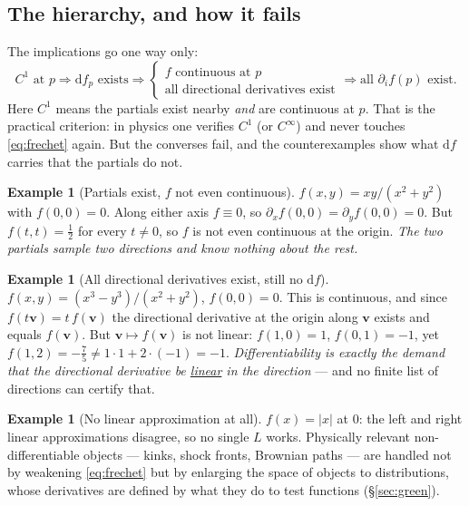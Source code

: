 \documentclass[10pt,a4paper]{article}
\newcommand{\dd}{\mathrm{d}}
\newcommand{\vv}{\mathbf{v}}
\theoremstyle{plain}
\theoremstyle{definition}
\newtheorem{ex}[thm]{Example}
\numberwithin{equation}{section}
\begin{document}
\subsection{The hierarchy, and how it fails}

The implications go one way only:
\begin{equation}
C^1\text{ at }p \Longrightarrow \dd f_p \text{ exists} \Longrightarrow
\begin{cases} f \text{ continuous at } p\\[1pt] \text{all directional derivatives exist}\end{cases}
\Longrightarrow \text{all } \partial_i f(p) \text{ exist.}
\label{eq:hierarchy}
\end{equation}
Here $C^1$ means the partials exist nearby \emph{and} are continuous at $p$. That is the
practical criterion: in physics one verifies $C^1$ (or $C^\infty$) and never touches
\eqref{eq:frechet} again. But the converses fail, and the counterexamples show what $\dd f$
carries that the partials do not.

\begin{ex}[Partials exist, $f$ not even continuous]\label{ex:xy}
$f(x,y)=xy/(x^2+y^2)$ with $f(0,0)=0$. Along either axis $f\equiv0$, so
$\partial_xf(0,0)=\partial_yf(0,0)=0$. But $f(t,t)=\tfrac12$ for every $t\ne0$, so $f$ is not
even continuous at the origin. \emph{The two partials sample two directions and know nothing
about the rest.}
\end{ex}

\begin{ex}[All directional derivatives exist, still no $\dd f$]\label{ex:allderiv}
$f(x,y)=(x^3-y^3)/(x^2+y^2)$, $f(0,0)=0$. This is continuous, and since $f(t\vv)=t\,f(\vv)$ the
directional derivative at the origin along $\vv$ exists and equals $f(\vv)$. But
$\vv\mapsto f(\vv)$ is not linear: $f(1,0)=1$, $f(0,1)=-1$, yet
$f(1,2)=-\tfrac75 \ne 1\cdot1+2\cdot(-1)=-1$. \emph{Differentiability is exactly the demand
that the directional derivative be \underline{linear} in the direction} --- and no finite list
of directions can certify that.
\end{ex}

\begin{ex}[No linear approximation at all]\label{ex:nolinear}
$f(x)=|x|$ at $0$: the left and right linear approximations disagree, so no single $L$ works.
Physically relevant non-differentiable objects --- kinks, shock fronts, Brownian paths --- are
handled not by weakening \eqref{eq:frechet} but by enlarging the space of objects to
distributions, whose derivatives are defined by what they do to test functions
(\S\ref{sec:green}).
\end{ex}
\end{document}
